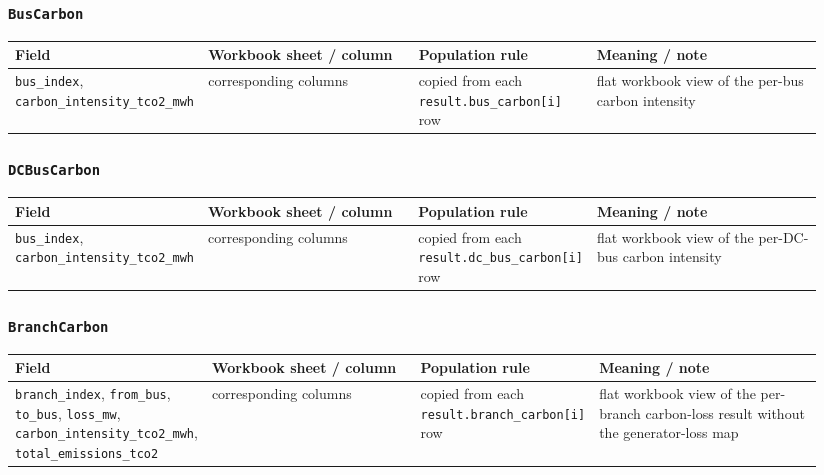 \subsubsection*{\texttt{BusCarbon}}

\begin{longtable}{@{}L{0.18\linewidth}L{0.26\linewidth}L{0.22\linewidth}L{0.28\linewidth}@{}}
\toprule
Field & Workbook sheet / column & Population rule & Meaning / note \\
\midrule
\endhead
\texttt{bus\_index}, \texttt{carbon\_intensity\_tco2\_mwh} & corresponding columns & copied from each \texttt{result.bus\_carbon[i]} row & flat workbook view of the per-bus carbon intensity \\
\bottomrule
\end{longtable}

\subsubsection*{\texttt{DCBusCarbon}}

\begin{longtable}{@{}L{0.18\linewidth}L{0.26\linewidth}L{0.22\linewidth}L{0.28\linewidth}@{}}
\toprule
Field & Workbook sheet / column & Population rule & Meaning / note \\
\midrule
\endhead
\texttt{bus\_index}, \texttt{carbon\_intensity\_tco2\_mwh} & corresponding columns & copied from each \texttt{result.dc\_bus\_carbon[i]} row & flat workbook view of the per-DC-bus carbon intensity \\
\bottomrule
\end{longtable}

\subsubsection*{\texttt{BranchCarbon}}

\begin{longtable}{@{}L{0.18\linewidth}L{0.26\linewidth}L{0.22\linewidth}L{0.28\linewidth}@{}}
\toprule
Field & Workbook sheet / column & Population rule & Meaning / note \\
\midrule
\endhead
\texttt{branch\_index}, \texttt{from\_bus}, \texttt{to\_bus}, \texttt{loss\_mw}, \texttt{carbon\_intensity\_tco2\_mwh}, \texttt{total\_emissions\_tco2} & corresponding columns & copied from each \texttt{result.branch\_carbon[i]} row & flat workbook view of the per-branch carbon-loss result without the generator-loss map \\
\bottomrule
\end{longtable}

